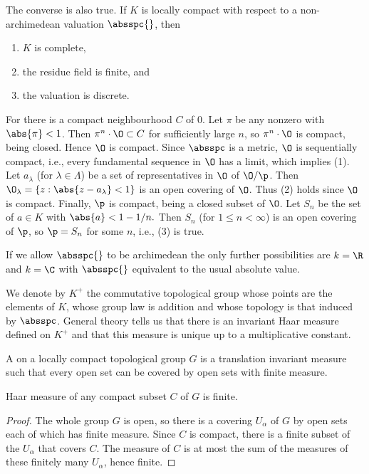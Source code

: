 \begin{remark}\label{rem:locally_compact}
The converse is also true.  If $K$ is locally compact with respect to
a non-archimedean valuation $\absspc{}$, then
\begin{enumerate}
\item $K$ is complete,
\item the residue field is finite, and
\item the valuation is discrete.
\end{enumerate}
For there is a compact neighbourhood $C$ of $0$.  
Let $\pi$ be any nonzero with $\abs{\pi}<1$.
Then $\pi^n\cdot
\O\subset C$ for sufficiently large $n$, so $\pi^n\cdot \O$ is
compact, being closed.  Hence $\O$ is compact.  Since $\absspc$ is a
metric, $\O$ is sequentially compact, i.e., every fundamental sequence
in $\O$ has a limit, which implies (1).  Let $a_\lambda$ (for
$\lambda\in\Lambda$) be a set of representatives in $\O$ of $\O/\p$.
Then $\O_{\lambda} = \{z : \abs{z-a_{\lambda}}<1\}$ is an open
covering of $\O$.  Thus (2) holds since $\O$ is compact.  Finally,
$\p$ is compact, being a closed subset of $\O$.  Let $S_n$ be the set
of $a\in K$ with $\abs{a}<1-1/n.$  Then $S_n$ (for $1\leq n < \infty$)
is an open covering of $\p$, so $\p=S_n$ for some $n$, i.e., (3) is
true. 

If we allow $\absspc{}$ to be archimedean the only further
possibilities are $k=\R$ and $k=\C$ with $\absspc{}$ equivalent to the
usual absolute value.
\end{remark}

We denote by $K^+$ the commutative topological group whose points are
the elements of $K$, whose group law is addition and whose topology is
that induced by $\absspc$.  General theory tells us that there is an
invariant Haar measure defined on $K^+$ and that this
measure is unique up to a multiplicative constant.  

\begin{definition}\label{defn:haar}
A  on a locally compact topological group 
$G$ is a translation invariant measure such that every open
set can be covered by open sets with finite measure. 
\end{definition}

\begin{lemma}
  Haar measure of any compact subset $C$ of $G$ is finite.  
\end{lemma}
\begin{proof}
The whole group $G$ is open, so there is a covering $U_\alpha$
of $G$ by open sets each of which has finite measure. 
Since $C$ is compact, there is a finite subset of the $U_\alpha$
that covers $C$.  The measure of $C$ is at most the sum of
the measures of these finitely many $U_\alpha$, hence finite.
\end{proof}

